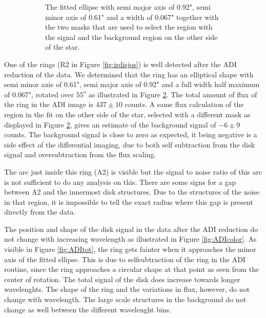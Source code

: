 \documentclass[twoside,single]{lion-msc}
\begin{document}
\begin{figure}[!b]
\begin{subfigure}{.48\textwidth}
  \caption{The fitted ellipse with semi major axis of 0.92", semi minor axis of 0.61" and a width of 0.067" together with the two masks that are used to select the region with the signal and the background region on the other side of the star.}
  \label{fig:ADIfit}
\end{subfigure}
\caption{}
\end{figure}

One of the rings (R2 in Figure \ref{fig:irdisjos}) is well detected after the ADI reduction of the data. We determined that the ring has an elliptical shape with semi minor axis of 0.61", semi major axis of 0.92" and a full width half maximum of 0.067", rotated over $55^o$ as illustrated in Figure \ref{fig:ADIfit}. The total amount of flux of the ring in the ADI image is $437\pm 10$ counts. A same flux calculation of the region in the fit on the other side of the star, selected with a different mask as displayed in Figure \ref{fig:ADIfit}, gives an estimate of the background signal of $-6\pm 9$ counts. The background signal is close to zero as expected, it being negative is a side effect of the differential imaging, due to both self subtraction from the disk signal and oversubtraction from the flux scaling. 
\bigskip

The arc just inside this ring (A2) is visible but the signal to noise ratio of this arc is not sufficient to do any analysis on this. There are some signs for a gap between A2 and the innermost disk structures. Due to the structures of the noise in that region, it is impossible to tell the exact radius where this gap is present directly from the data. 
\bigskip

The position and shape of the disk signal in the data after the ADI reduction do not change with increasing wavelength as illustrated in Figure \ref{fig:ADIcolor}. As visible in Figure \ref{fig:ADItot}, the ring gets fainter when it approaches the minor axis of the fitted ellipse. This is due to selfsubtraction of the ring in the ADI routine, since the ring approaches a circular shape at that point as seen from the center of rotation. The total signal of the disk does increase towards longer wavelenghts. The shape of the ring and the variations in flux, however, do not change with wavelength. The large scale structures in the background do not change as well between the different wavelenght bins.
\end{document}
